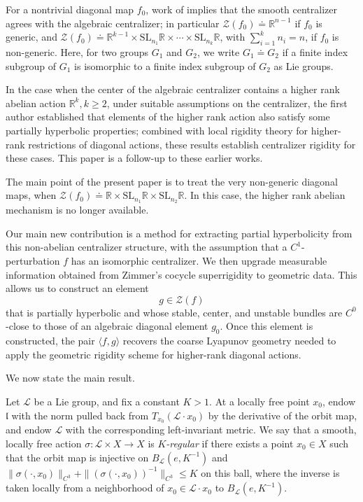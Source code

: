 \documentclass[11pt]{amsart}
\numberwithin{equation}{section}
\newcommand{\R}{\mathbb{R}}
\theoremstyle{plain}
\begin{document}
For a nontrivial diagonal map $f_0$, work of \cite{DWWX} implies that the smooth centralizer agrees with the algebraic centralizer; in particular $\mathcal Z(f_0)\doteq \R^{n-1}$ if $f_0$ is generic, and $\mathcal Z(f_0)\doteq \R^{k-1}\times \mathrm{SL}_{n_1}\R\times \cdots \times \mathrm{SL}_{n_k}\R$, with $\sum_{i=1}^kn_i=n$, if $f_0$ is non-generic. Here, for two groups $G_1$ and $G_2$, we write $G_1\doteq G_2$ if a finite index subgroup of $G_1$ is isomorphic to a finite index subgroup of $G_2$ as Lie groups.

In the case when  the center of the algebraic
centralizer contains a higher rank abelian action $\R^k,k\ge 2$, under suitable assumptions on the centralizer, the first author \cite{Wang,Wang26} established that elements of the higher rank action also satisfy some partially hyperbolic properties; combined with local rigidity theory for higher-rank restrictions of diagonal actions, these results establish centralizer rigidity for these cases. This paper is a follow-up to these earlier works.


The main point of the present paper is to treat the very non-generic diagonal maps, when $\mathcal Z(f_0)\doteq \R\times \mathrm{SL}_{n_1}\R\times \mathrm{SL}_{n_2}\R$. In this case, the higher rank abelian mechanism is no
longer available.  

Our main new contribution is a method for extracting partial hyperbolicity
from this non-abelian centralizer structure, with the assumption that a $C^1$-perturbation $f$ has an isomorphic centralizer. We then upgrade
 measurable information obtained from Zimmer's cocycle superrigidity   to geometric data. This allows us to construct an element
\[
        g\in \mathcal Z(f)
\]
that is partially hyperbolic and whose stable, center, and unstable bundles
are \(C^0\)-close to those of an algebraic diagonal element \(g_0\).  Once
this element is constructed, the pair \(\langle f,g\rangle\) recovers the
coarse Lyapunov geometry needed to apply the geometric rigidity scheme for
higher-rank diagonal actions.

We now state the main result.


Let $\mathcal L$ be a Lie group, and fix a constant $K>1$.
  At a locally free point
$x_0$, endow $\mathfrak l$ with the norm pulled back from
$T_{x_0}(\mathcal L\cdot x_0)$ by the derivative of the orbit map, and
endow $\mathcal L$ with the corresponding left-invariant metric. We say that a smooth, locally free action $\sigma: \mathcal L\times X\to X$ is {\em $K$-regular} if there exists a point $x_0\in X$ such that the orbit map is injective on $B_{\mathcal L}(e,K^{-1})$ and
$\| \sigma(\cdot, x_0)\|_{C^3}+\| (\sigma(\cdot, x_0))^{-1}\|_{C^3}\le K$ on this ball, where the inverse is taken locally from a neighborhood of $x_0\in \mathcal L\cdot x_0$ to $B_{\mathcal L}(e,K^{-1})$.
\end{document}
